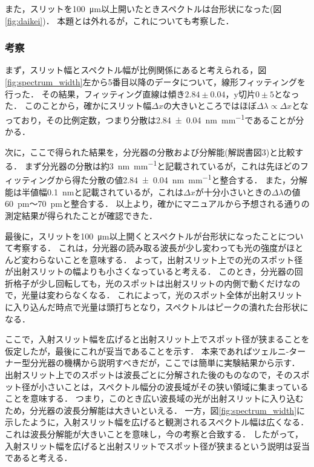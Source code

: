 \documentclass[titlepage]{jsarticle}
\begin{document}
また，スリットを\SI{100}{\um}以上開いたときスペクトルは台形状になった(図\ref{fig:daikei})．
本題とは外れるが，これについても考察した．

\subsubsection{考察}
まず，スリット幅とスペクトル幅が比例関係にあると考えられる，図\ref{fig:spectrum_width}左から5番目以降のデータについて，線形フィッティングを行った．
その結果，フィッティング直線は傾き$2.84\pm 0.04$，y切片$0\pm 5$となった．
このことから，確かにスリット幅$\Delta x$の大きいところではほぼ$\Delta \lambda \propto \Delta x$となっており，その比例定数，つまり分散は\SI[separate-uncertainty]{2.84\pm 0.04}{\nm\per\mm}であることが分かる．

次に，ここで得られた結果を，分光器の分散および分解能(解説書図3)と比較する．
まず分光器の分散は約\SI{3}{\nm\per\mm}と記載されているが，これは先ほどのフィッティングから得た分散の値\SI[separate-uncertainty]{2.84\pm 0.04}{\nm\per\mm}と整合する．
また，分解能は半値幅\SI{0.1}{\nm}と記載されているが，これは$\Delta x$が十分小さいときの$\Delta \lambda$の値\SI{60}{\pm}～\SI{70}{\pm}と整合する．
以上より，確かにマニュアルから予想される通りの測定結果が得られたことが確認できた．

最後に，スリットを\SI{100}{\um}以上開くとスペクトルが台形状になったことについて考察する．
これは，分光器の読み取る波長が少し変わっても光の強度がほとんど変わらないことを意味する．
よって，出射スリット上での光のスポット径が出射スリットの幅よりも小さくなっていると考える．
このとき，分光器の回折格子が少し回転しても，光のスポットは出射スリットの内側で動くだけなので，光量は変わらなくなる．
これによって，光のスポット全体が出射スリットに入り込んだ時点で光量は頭打ちとなり，スペクトルはピークの潰れた台形状になる．

ここで，入射スリット幅を広げると出射スリット上でスポット径が狭まることを仮定したが，最後にこれが妥当であることを示す．
本来であればツェルニ-ターナー型分光器の機構から説明すべきだが，ここでは簡単に実験結果から示す．
出射スリット上でのスポットは波長ごとに分解された後のものなので，そのスポット径が小さいことは，スペクトル幅分の波長域がその狭い領域に集まっていることを意味する．
つまり，このとき広い波長域の光が出射スリットに入り込むため，分光器の波長分解能は大きいといえる．
一方，図\ref{fig:spectrum_width}に示したように，入射スリット幅を広げると観測されるスペクトル幅は広くなる．
これは波長分解能が大きいことを意味し，今の考察と合致する．
したがって，入射スリット幅を広げると出射スリットでスポット径が狭まるという説明は妥当であると考える．
\end{document}
